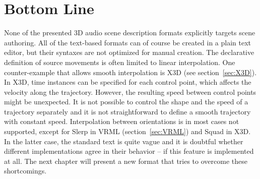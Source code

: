 \section{Bottom Line}

None of the presented 3D audio scene description formats
explicitly targets scene authoring.
All of the text-based formats can of course be created in a plain text editor,
but their syntaxes are not optimized for manual creation.
The declarative definition of source movements
is often limited to linear interpolation.
One counter-example that allows smooth interpolation
is X3D (see section~\ref{sec:X3D}).
In X3D, time instances can be specified for each control point,
which affects the velocity along the trajectory.
However, the resulting speed between control points might be unexpected.
It is not possible to control
the shape and the speed of a trajectory separately and
it is not straightforward to define a smooth trajectory with constant speed.
Interpolation between orientations is in most cases not supported,
except for Slerp in VRML (section~\ref{sec:VRML})
and Squad in X3D.
In the latter case, the standard text is quite vague
and it is doubtful whether different implementations agree in their behavior
-- if this feature is implemented at all.
The next chapter will present a new format that tries to overcome
these shortcomings.
